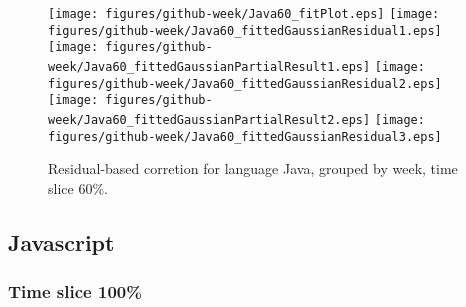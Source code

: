 \begin{figure}[t]
\centering
{}
{\texttt{[image: figures/github-week/Java60\_fitPlot.eps]}}
{\texttt{[image: figures/github-week/Java60\_fittedGaussianResidual1.eps]}}
{\texttt{[image: figures/github-week/Java60\_fittedGaussianPartialResult1.eps]}}
{\texttt{[image: figures/github-week/Java60\_fittedGaussianResidual2.eps]}}
{\texttt{[image: figures/github-week/Java60\_fittedGaussianPartialResult2.eps]}}
{\texttt{[image: figures/github-week/Java60\_fittedGaussianResidual3.eps]}}
\caption{Residual-based corretion for language Java, grouped by week, time slice 60\%.}
\end{figure}


\FloatBarrier


\subsection{Javascript}

\subsubsection{Time slice 100\%}

